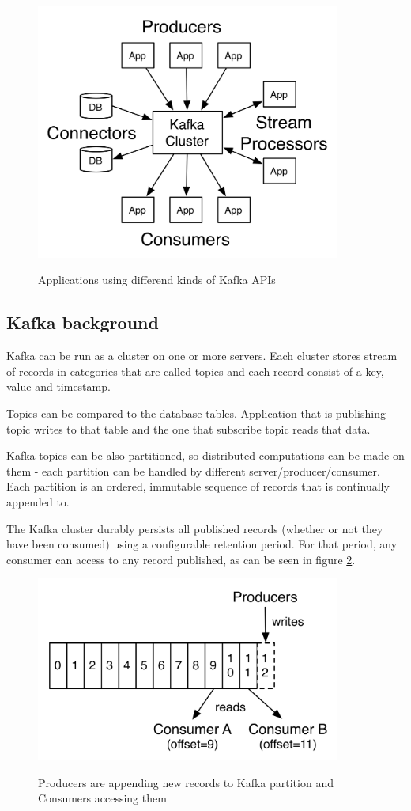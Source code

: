 \begin{figure}[h]
  \center
  \includegraphics[width=100mm]{img/kafka-apis.png}
  \label{frameworks:kafka:api}
  \caption{Applications using differend kinds of Kafka APIs}
\end{figure}



\subsection{Kafka background \label{frameworks:kafka:background}}

Kafka can be run as a cluster on one or more servers.
Each cluster stores stream of records in categories that are called topics
and each record consist of a key, value and timestamp.

Topics can be compared to the database tables. Application that is publishing topic
writes to that table and the one that subscribe topic reads that data.

Kafka topics can be also partitioned, so distributed computations can be made
on them - each partition can be handled by different server/producer/consumer.
Each partition is an ordered, immutable sequence of records that is
continually appended to.

The Kafka cluster durably persists all published records (whether or not they have been consumed)
using a configurable retention period. For that period, any consumer can access
to any record published, as can be seen in figure \ref{frameworks:kafka:partitions}.

\begin{figure}[h]
  \center
  \includegraphics[width=100mm]{img/kafka-partitions.png}
  \label{frameworks:kafka:partitions}
  \caption{Producers are appending new records to Kafka partition and Consumers accessing them}
\end{figure}

